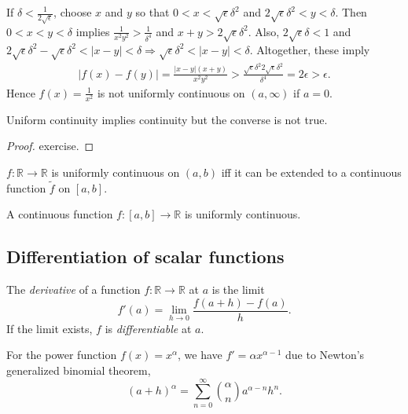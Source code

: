 \begin{solution}
If $\delta<\frac{1}{2\sqrt{\epsilon}}$,
 choose $x$ and $y$ so that $0<x<\sqrt{\epsilon}\delta^2$
 and $2\sqrt{\epsilon}\delta^2<y<\delta$.
Then $0<x<y<\delta$ implies $\frac{1}{x^2y^2}>\frac{1}{\delta^4}$
 and $x+y> 2\sqrt{\epsilon}\delta^2$.
Also, $2\sqrt{\epsilon}\delta<1$ and
 $2\sqrt{\epsilon}\delta^2-\sqrt{\epsilon}\delta^2<|x-y|<\delta \Rightarrow \sqrt{\epsilon}\delta^2<|x-y|<\delta$.
Altogether, these imply
\begin{align*}
|f(x)-f(y)| = \frac{|x-y|(x+y)}{x^2y^2}
> \frac{\sqrt{\epsilon}\delta^2 2\sqrt{\epsilon}\delta^2}{\delta^4}
=2\epsilon>\epsilon.
\end{align*}
Hence $f(x)=\frac{1}{x^2}$ is not uniformly continuous on $(a,\infty)$ if
$a=0$.
\end{solution}

\begin{thm}
  Uniform continuity implies continuity
   but the converse is not true.
\end{thm}
\begin{proof}
  exercise.
\end{proof}

\begin{lem}
  \label{lem:uniformContExtension}
  $f: \mathbb{R}\rightarrow \mathbb{R}$
  is uniformly continuous on $(a,b)$
  iff it can be extended
  to a continuous function $\tilde{f}$ on $[a,b]$.
\end{lem}

\begin{thm}
  \label{thm:uniformContinuityScalarFunc}
  A continuous function $f: [a,b]\rightarrow \mathbb{R}$
  is uniformly continuous.
\end{thm}


\subsection{Differentiation of scalar functions}
\label{sec:diff-funct}

\begin{defn}
  \label{def:derivative}
  The \emph{derivative}
   of a function $f: \mathbb{R}\rightarrow \mathbb{R}$
   at $a$ is the limit
   \begin{equation}
     \label{eq:derivative}
     f'(a)=\lim_{h\rightarrow 0} \frac{f(a+h)-f(a)}{h}.
   \end{equation}
  If the limit exists, $f$ is \emph{differentiable} at $a$.
\end{defn}

\begin{exm}
  For the power function \mbox{$f(x)=x^{\alpha}$}, 
   we have $f'=\alpha x^{\alpha-1}$
   due to
   Newton's generalized binomial theorem, 
  \begin{equation*}
    (a+h)^{\alpha}=\sum_{n=0}^{\infty}{\alpha \choose n}a^{\alpha-n}h^n.
  \end{equation*}
\end{exm}

